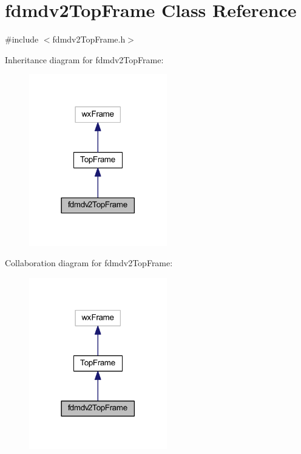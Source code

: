 \hypertarget{classfdmdv2_top_frame}{\section{fdmdv2\-Top\-Frame Class Reference}
\label{classfdmdv2_top_frame}
}


{\ttfamily \#include $<$fdmdv2\-Top\-Frame.\-h$>$}



Inheritance diagram for fdmdv2\-Top\-Frame\-:\nopagebreak
\begin{figure}[H]
\begin{center}
\leavevmode
\includegraphics[width=170pt]{classfdmdv2_top_frame__inherit__graph}
\end{center}
\end{figure}


Collaboration diagram for fdmdv2\-Top\-Frame\-:\nopagebreak
\begin{figure}[H]
\begin{center}
\leavevmode
\includegraphics[width=170pt]{classfdmdv2_top_frame__coll__graph}
\end{center}
\end{figure}
